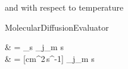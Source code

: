 and with respect to temperature
\begin{equationCode}{MolecularDiffusionEvaluator}
\begin{split}
 & = \diff_s 
                                     {\displaystyle\sum_{j_m \neq s} } \\
\uu \frac{[cm^2\,s^{-1}]}{[K]} & \uu = [cm^2\,s^{-1}] 
                                                           {\displaystyle\sum_{j_m \neq s} \frac{[cm^{-3}]}{[cm^2\,s^{-1}]}}
\end{split}
\label{Titan:Ds_dT}
\end{equationCode}


